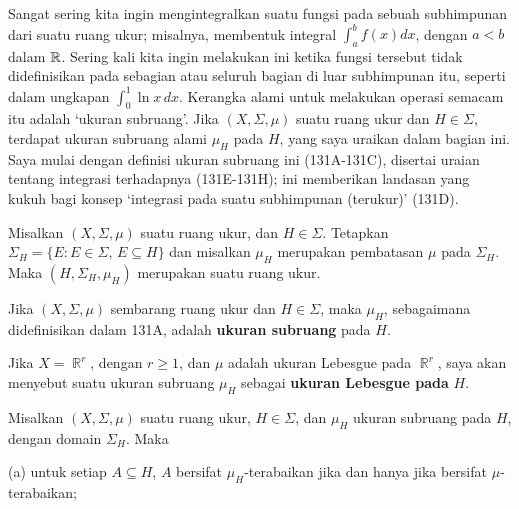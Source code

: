 
\def\chaptername{Pelengkap}
\def\sectionname{Subruang terukur}


Sangat sering kita ingin mengintegralkan suatu fungsi pada sebuah
subhimpunan dari suatu ruang ukur; misalnya, membentuk integral
$\int_a^bf(x)dx$, dengan $a<b$ dalam $\Bbb R$. Sering kali kita ingin
melakukan ini ketika fungsi tersebut tidak didefinisikan pada sebagian
atau seluruh bagian di luar subhimpunan itu, seperti dalam ungkapan
$\int_0^1\ln x\,dx$. Kerangka alami untuk melakukan operasi semacam itu
adalah `ukuran subruang'. Jika $(X,\Sigma,\mu)$ suatu ruang ukur dan
$H\in\Sigma$, terdapat ukuran subruang alami $\mu_H$ pada $H$, yang
saya uraikan dalam bagian ini.
Saya mulai dengan definisi ukuran subruang ini (131A-131C), disertai
uraian tentang integrasi terhadapnya (131E-131H); ini memberikan
landasan yang kukuh bagi konsep `integrasi pada suatu subhimpunan
(terukur)' (131D).

 Misalkan $(X,\Sigma,\mu)$ suatu ruang ukur, dan
$H\in\Sigma$. Tetapkan $\Sigma_H=\{E:E\in\Sigma,\,E\subseteq H\}$ dan
misalkan $\mu_H$ merupakan pembatasan $\mu$ pada $\Sigma_H$. Maka
$(H,\Sigma_H,\mu_H)$ merupakan suatu ruang ukur.


 Jika $(X,\Sigma,\mu)$ sembarang ruang ukur dan
$H\in\Sigma$, maka $\mu_H$, sebagaimana didefinisikan dalam 131A,
adalah {\bf ukuran subruang} pada $H$.

Jika $X=\BbbR^r$, dengan $r\ge 1$, dan $\mu$ adalah ukuran Lebesgue
pada $\BbbR^r$, saya akan menyebut suatu ukuran subruang $\mu_H$
sebagai {\bf ukuran Lebesgue pada} $H$.


 Misalkan $(X,\Sigma,\mu)$ suatu ruang ukur,
$H\in\Sigma$, dan $\mu_H$ ukuran subruang pada $H$, dengan domain
$\Sigma_H$. Maka

(a) untuk setiap $A\subseteq H$, $A$ bersifat $\mu_H$-terabaikan jika
dan hanya jika bersifat $\mu$-terabaikan;

